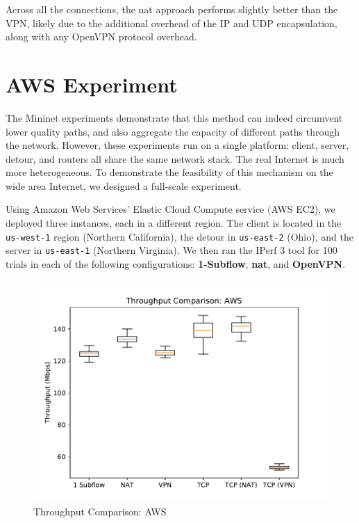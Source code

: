 \documentclass{cwru}
\begin{document}
Across all the connections, the \ac{nat} approach performs slightly better than
the VPN, likely due to the additional overhead of the IP and UDP encapsulation,
along with any OpenVPN protocol overhead.

\section{AWS Experiment}

The Mininet experiments demonstrate that this method can indeed circumvent lower
quality paths, and also aggregate the capacity of different paths through the
network. However, these experiments run on a single platform: client, server,
detour, and routers all share the same network stack. The real Internet is much
more heterogeneous. To demonstrate the feasibility of this mechanism on the wide
area Internet, we designed a full-scale experiment.

Using Amazon Web Services' Elastic Cloud Compute service (AWS EC2), we deployed
three instances, each in a different region. The client is located in the
\texttt{us-west-1} region (Northern California), the detour in
\texttt{us-east-2} (Ohio), and the server in \texttt{us-east-1} (Northern
Virginia). We then ran the IPerf 3 tool for 100 trials in each of the following
configurations: \textbf{1-Subflow}, \textbf{\ac{nat}}, and \textbf{OpenVPN}.

\begin{figure}
  \centering
  \includegraphics[height=0.45\textheight]{figures/aws.pdf}
  \caption{Throughput Comparison: AWS}
  \label{fig:aws}
\end{figure}
\end{document}
